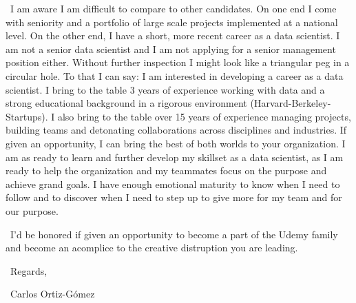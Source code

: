 \documentclass{crortiz_cv_2021}
\begin{document}
{\vspace{5mm} %
\indent \ I am aware I am difficult to compare to other candidates. On one end I come with seniority and a portfolio of large scale projects implemented at a national level. On the other end, I have a short, more recent career as a data scientist. I am not a senior data scientist and I am not applying for a senior management position either. Without further inspection I might look like a triangular peg in a circular hole. To that I can say: I am interested in developing a career as a data scientist. I bring to the table 3 years of experience working with data and a strong educational background in a rigorous environment (Harvard-Berkeley-Startups). I also bring to the table over 15 years of experience managing projects, building teams and detonating collaborations across disciplines and industries. If given an opportunity, I can bring the best of both worlds to your organization. I am as ready to learn and further develop my skillset as a data scientist, as I am ready to help the organization and my teammates focus on the purpose and achieve grand goals. I have enough emotional maturity to know when I need to follow and to discover when I need to step up to give more for my team and for our purpose. 

\vspace{5mm} %
\indent \ I'd be honored if given an opportunity to become a part of the Udemy family and become an acomplice to the creative distruption you are leading.

\vspace{5mm} %
\ Regards,

\vspace{5mm} %
\ Carlos Ortiz-Gómez
}
\createfootnote
\end{document}

